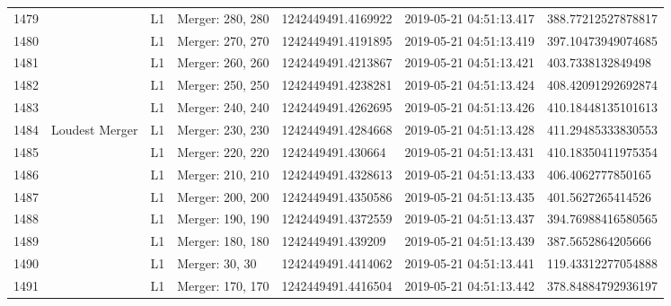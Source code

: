 \begin{longtable}{lllllll}
1479 &                                                    &       L1 &  Merger: 280, 280 &  1242449491.4169922 &  2019-05-21 04:51:13.417 &  388.77212527878817 \\
1480 &                                                    &       L1 &  Merger: 270, 270 &  1242449491.4191895 &  2019-05-21 04:51:13.419 &  397.10473949074685 \\
1481 &                                                    &       L1 &  Merger: 260, 260 &  1242449491.4213867 &  2019-05-21 04:51:13.421 &   403.7338132849498 \\
1482 &                                                    &       L1 &  Merger: 250, 250 &  1242449491.4238281 &  2019-05-21 04:51:13.424 &  408.42091292692874 \\
1483 &                                                    &       L1 &  Merger: 240, 240 &  1242449491.4262695 &  2019-05-21 04:51:13.426 &  410.18448135101613 \\
1484 &                                     Loudest Merger &       L1 &  Merger: 230, 230 &  1242449491.4284668 &  2019-05-21 04:51:13.428 &  411.29485333830553 \\
1485 &                                                    &       L1 &  Merger: 220, 220 &   1242449491.430664 &  2019-05-21 04:51:13.431 &  410.18350411975354 \\
1486 &                                                    &       L1 &  Merger: 210, 210 &  1242449491.4328613 &  2019-05-21 04:51:13.433 &   406.4062777850165 \\
1487 &                                                    &       L1 &  Merger: 200, 200 &  1242449491.4350586 &  2019-05-21 04:51:13.435 &   401.5627265414526 \\
1488 &                                                    &       L1 &  Merger: 190, 190 &  1242449491.4372559 &  2019-05-21 04:51:13.437 &  394.76988416580565 \\
1489 &                                                    &       L1 &  Merger: 180, 180 &   1242449491.439209 &  2019-05-21 04:51:13.439 &   387.5652864205666 \\
1490 &                                                    &       L1 &    Merger: 30, 30 &  1242449491.4414062 &  2019-05-21 04:51:13.441 &  119.43312277054888 \\
1491 &                                                    &       L1 &  Merger: 170, 170 &  1242449491.4416504 &  2019-05-21 04:51:13.442 &  378.84884792936197 \\

\end{longtable}
